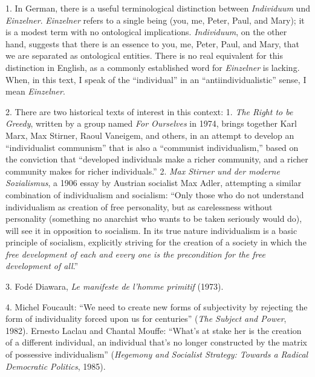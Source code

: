 {
    \setlength{\parindent}{0pt}
    \setlength{\parskip}{\baselineskip}

    1. In German, there is a useful terminological distinction between
    \textit{Individuum} und \textit{Einzelner}. \textit{Einzelner} refers to a
    single being (you, me, Peter, Paul, and Mary); it is a modest term with no
    ontological implications. \textit{Individuum}, on the other hand, suggests
    that there is an essence to you, me, Peter, Paul, and Mary, that we are
    separated as ontological entities. There is no real equivalent for this
    distinction in English, as a commonly established word for
    \textit{Einzelner} is lacking. When, in this text, I speak of the
    “individual” in an “antiindividualistic” sense, I mean \textit{Einzelner}.

    2. There are two historical texts of interest in this context: 1.
    \textit{The Right to be Greedy}, written by a group named \textit{For
    Ourselves} in 1974, brings together Karl Marx, Max Stirner, Raoul Vaneigem,
    and others, in an attempt to develop an “individualist communism” that is
    also a “communist individualism,” based on the conviction that “developed
    individuals make a richer community, and a richer community makes for richer
    individuals.” 2. \textit{Max Stirner und der moderne Sozialismus}, a 1906
    essay by Austrian socialist Max Adler, attempting a similar combination of
    individualism and socialism: “Only those who do not understand individualism
    as creation of free personality, but as carelessness without personality
    (something no anarchist who wants to be taken seriously would do), will see
    it in opposition to socialism. In its true nature individualism is a basic
    principle of socialism, explicitly striving for the creation of a society in
    which the \textit{free development of each and every one is the precondition
    for the free development of all}.”

    3. Fodé Diawara, \textit{Le manifeste de l'homme primitif} (1973).

    4. Michel Foucault: “We need to create new forms of subjectivity by
    rejecting the form of individuality forced upon us for centuries”
    (\textit{The Subject and Power}, 1982). Ernesto Laclau and Chantal Mouffe:
    “What’s at stake her is the creation of a different individual, an
    individual that’s no longer constructed by the matrix of possessive
    individualism” (\textit{Hegemony and Socialist Strategy: Towards a Radical
    Democratic Politics}, 1985).

}
